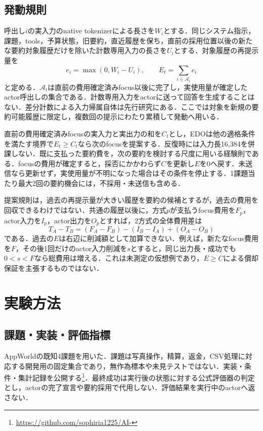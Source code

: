\documentclass[letter]{ieicej}
\begin{document}
\subsection{発動規則}
呼出し$i$の実入力のnative tokenizerによる長さを$W_i$とする．同じシステム指示，課題，tools，予算状態，旧要約，直近履歴を保ち，直前の採用位置以後の新たな要約対象履歴だけを除いた計数専用入力の長さを$U_i$とする．対象履歴の再提示量を
\begin{equation}
 e_i=\max(0,W_i-U_i),\qquad
 E_t=\sum_{i\in\mathcal{A}_t} e_i
 \label{eq:exposure}
\end{equation}
と定める．$\mathcal{A}_t$は直前の費用確定済みfocus以後に完了し，実使用量が確定したactor呼出しの集合である．計数専用入力をactorに送って回答を生成することはない．差分計数による入力帰属自体は先行研究\cite{singh2026tca}にある．ここでは対象を新規の要約可能履歴に限定し，複数回の提示にわたり累積して発動へ用いる．

直前の費用確定済みfocusの実入力と実出力の和を$C_t$とし，EDOは他の適格条件を満たす境界で$E_t\ge C_t$なら次のfocusを提案する．反復時には入力長16,384を併課しない．既に支払った要約費を，次の要約を検討する尺度に用いる経験則である．focusの費用が確定すると，採否にかかわらず$C$を更新し$E$を0へ戻す．未送信なら更新せず，実使用量が不明になった場合はその条件を停止する．1課題当たり最大2回の要約機会には，不採用・未送信も含める．

提案規則は，過去の再提示量が大きい履歴を要約の候補とするが，過去の費用を回収できるわけではない．共通の履歴以後に，方式$p$が支払うfocus費用を$F_p$，actor入力を$I_p$，actor出力を$O_p$とすれば，2方式の全体費用差は
\begin{equation}
 T_A-T_B=(F_A-F_B)-(I_B-I_A)+(O_A-O_B)
 \label{eq:cost}
\end{equation}
である．過去の$E$は右辺に削減額として加算できない．例えば，新たなfocus費用を$F$，その後1回だけのactor入力削減を$s$とすると，同じ出力長・成功でも$0<s<F$なら総費用は増える．これは未測定の仮想例であり，$E\ge C$による償却保証を主張するものではない．

\section{実験方法}
\subsection{課題・実装・評価指標}
AppWorld\cite{trivedi2024appworld}の既知4課題を用いた．課題は写真操作，精算，返金，CSV処理に対応する開発用の固定集合であり，無作為標本や未見テストではない．実装・条件・集計記録を公開する\footnote{\url{https://github.com/sophiria1225/AI-}}．最終成功は実行後の状態に対する公式評価器の判定とし，actorの完了宣言や要約採用で代用しない．評価結果を実行中のactorへ返さない．
\end{document}
